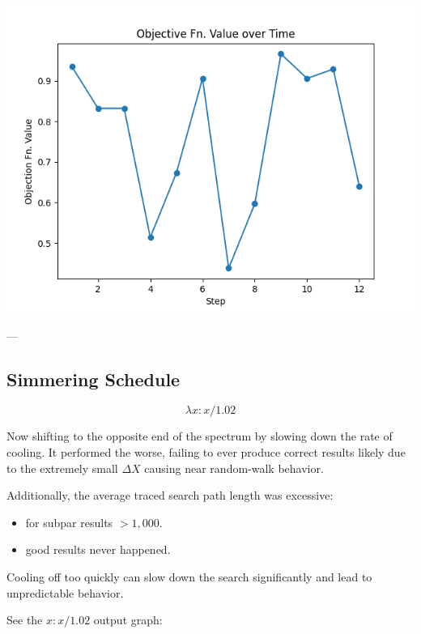 \documentclass{article}
\begin{document}
\includegraphics[width=6in]{_static/Figure_11_Temp=5_Obj-Fn-over-Time.png}

---

\subsection{Simmering Schedule}

$$\lambda x : x / 1.02$$

Now shifting to the opposite end of the spectrum by slowing down the rate of cooling.
It performed the worse, failing to ever produce correct results 
likely due to the extremely small $\Delta X$ causing near random-walk behavior.

Additionally, the average traced search path length was excessive:

\begin{itemize}
    \item for subpar results $> 1,000$.
    \item good results never happened.
\end{itemize}

Cooling off too quickly can slow down the search significantly 
and lead to unpredictable behavior.

See the $x : x / 1.02$ output graph:
\end{document}

